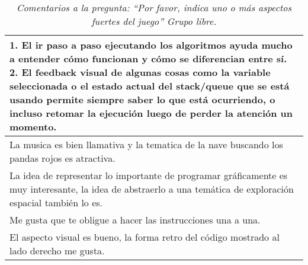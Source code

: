
\begin{table}[h]
   \centering
   \caption*{\textit{Comentarios a la pregunta: ``Por favor, indica uno o más aspectos fuertes del juego'' Grupo libre.}}
   \begin{tabular}{|p{\linewidth}|}
   \hline %
   1. El ir paso a paso ejecutando los algoritmos ayuda mucho a entender cómo funcionan y cómo se diferencian entre sí. 2. El feedback visual de algunas cosas como la variable seleccionada o el estado actual del stack/queue que se está usando permite siempre saber lo que está ocurriendo, o incluso retomar la ejecución luego de perder la atención un momento. \\\hline

   La musica es bien llamativa y la tematica de la nave buscando los pandas rojos es atractiva. \\\hline

   La idea de representar lo importante de programar gráficamente es muy interesante, la idea de abstraerlo a una temática de exploración espacial también lo es. \\\hline
   
   Me gusta que te obligue a hacer las instrucciones una a una. \\\hline

   El aspecto visual es bueno, la forma retro del código mostrado al lado derecho me gusta. \\\hline
   \hline
   \end{tabular}
\end{table}

\restoregeometry



